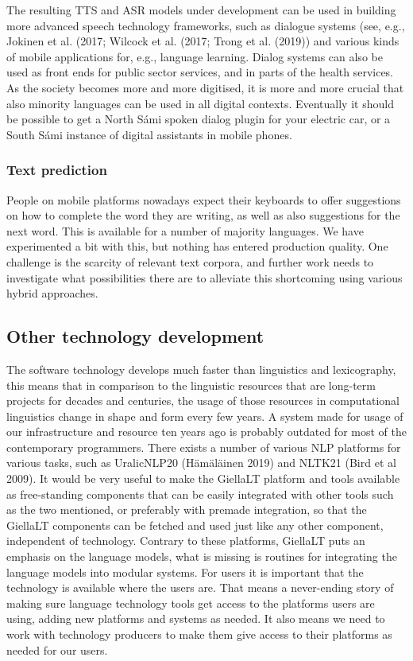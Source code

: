 \documentclass[free]{flammie}
\begin{document}
The resulting TTS and ASR models under development can be used in building more advanced speech technology frameworks, such as dialogue systems (see, e.g., Jokinen et al.
(2017; Wilcock et al. (2017; Trong et al. (2019)) and various kinds of mobile applications
for, e.g., language learning. Dialog systems can also be used as front ends for public sector
services, and in parts of the health services.
As the society becomes more and more digitised, it is more and more crucial that also
minority languages can be used in all digital contexts. Eventually it should be possible to
get a North Sámi spoken dialog plugin for your electric car, or a South Sámi instance of
digital assistants in mobile phones.

\subsubsection{Text prediction}

People on mobile platforms nowadays expect their keyboards to offer suggestions on how
to complete the word they are writing, as well as also suggestions for the next word. This
is available for a number of majority languages. We have experimented a bit with this, but
nothing has entered production quality. One challenge is the scarcity of relevant text corpora, and further work needs to investigate what possibilities there are to alleviate this
shortcoming using various hybrid approaches.

\subsection{Other technology development}

The software technology develops much faster than linguistics and lexicography, this
means that in comparison to the linguistic resources that are long-term projects for decades
and centuries, the usage of those resources in computational linguistics change in shape
and form every few years. A system made for usage of our infrastructure and resource ten
years ago is probably outdated for most of the contemporary programmers.
There exists a number of various NLP platforms for various tasks, such as UralicNLP20
(Hämäläinen 2019) and NLTK21 (Bird et al 2009). It would be very useful to make the
GiellaLT platform and tools available as free-standing components that can be easily integrated with other tools such as the two mentioned, or preferably with premade integration,
so that the GiellaLT components can be fetched and used just like any other component,
independent of technology. Contrary to these platforms, GiellaLT puts an emphasis on the
language models, what is missing is routines for integrating the language models into modular systems.
For users it is important that the technology is available where the users are. That means
a never-ending story of making sure language technology tools get access to the platforms
users are using, adding new platforms and systems as needed. It also means we need to
work with technology producers to make them give access to their platforms as needed for
our users.
\end{document}
